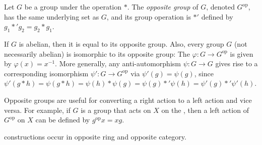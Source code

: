 \documentclass[12pt]{article}
\begin{document}
Let $G$ be a group under the operation $*$.  The \emph{opposite group} of $G$, denoted $G^{\mathrm{op}}$, has the same underlying set as $G$, and its group operation is $*'$ defined by $g_1*'g_2=g_2*g_1$.

If $G$ is abelian, then it is equal to its opposite group.  Also, every group $G$ (not necessarily abelian) is isomorphic to its opposite group:  The  $\varphi \colon G \to G^{\mathrm{op}}$ is given by $\varphi(x)=x^{-1}$.  More generally, any anti-automorphism $\psi \colon G \to G$ gives rise to a corresponding isomorphism $\psi' \colon G \to G^{\mathrm{op}}$ via $\psi'(g)=\psi(g)$, since $\psi'(g*h)=\psi(g*h)=\psi(h)*\psi(g)=\psi(g)*'\psi(h)=\psi'(g)*'\psi'(h)$.

Opposite groups are useful for converting a right action to a left action and vice versa.  For example, if $G$ is a group that acts on $X$ on the , then a left action of $G^{\mathrm{op}}$ on $X$ can be defined by $g^{\mathrm{op}}x=xg$.

 constructions occur in opposite ring and opposite category.



\end{document}
